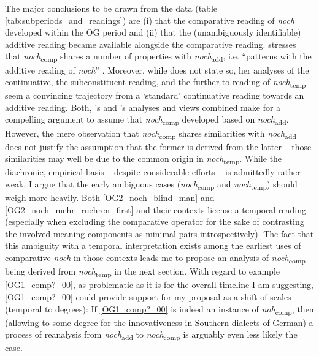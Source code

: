 \documentclass[output=paper,
modfonts
]{langscibook}
\begin{document}
The major conclusions to be drawn from the data (table \ref{tab:subperiods_and_readings}) are (i) that the comparative reading of \textit{noch} developed within the OG period and (ii) that the (unambiguously identifiable) additive reading became available alongside the comparative reading. \citeauthor{umbach2009a_comp} \citeyearpar{umbach2009a_comp} stresses that \textit{noch}\textsubscript{comp} shares a number of properties with \textit{noch}\textsubscript{add}, i.e. ``patterns with the additive reading of \textit{noch}'' \citep[p.9]{umbach2009a_comp}. Moreover, while \citeauthor{beck2016a_sub} does not state so, her \citeyearpar{beck2016a_sub} analyses of the continuative, the subconstituent reading, and the further-to reading of \textit{noch}\textsubscript{temp} seem a convincing trajectory from a `standard' continuative reading towards an additive reading. Both, \citeauthor{umbach2009a_comp}'s \citeyearpar{umbach2009a_comp} and \citeauthor{beck2016a_sub}'s \citeyearpar{beck2016a_sub} analyses and views combined make for a compelling argument to assume that \textit{noch}\textsubscript{comp} developed based on \textit{noch}\textsubscript{add}. However, the mere observation that \textit{noch}\textsubscript{comp} shares similarities with \textit{noch}\textsubscript{add} does not justify the assumption that the former is derived from the latter -- those similarities may well be due to the common origin in \textit{noch}\textsubscript{temp}. While the diachronic, empirical basis -- despite considerable efforts -- is admittedly rather weak, I argue that the early ambiguous cases (\textit{noch}\textsubscript{comp} and \textit{noch}\textsubscript{temp}) should weigh more heavily. Both \ref{OG2_noch_blind_man} and \ref{OG2_noch_mehr_ruehren_first} and their contexts license a temporal reading (especially when excluding the comparative operator for the sake of contrasting the involved meaning components as minimal pairs introspectively). The fact that this ambiguity with a temporal interpretation exists among the earliest uses of comparative \textit{noch} in those contexts leads me to propose an analysis of \textit{noch}\textsubscript{comp} being derived from \textit{noch}\textsubscript{temp} in the next section. With regard to example \ref{OG1_comp?_00}, as problematic as it is for the overall timeline I am suggesting, \ref{OG1_comp?_00} could provide support for my proposal as a shift of scales (temporal to degrees): If \ref{OG1_comp?_00} is indeed an instance of \textit{noh}\textsubscript{comp}, then (allowing to some degree for the innovativeness in Southern dialects of German) a process of reanalysis from \textit{noch}\textsubscript{add} to \textit{noch}\textsubscript{comp} is arguably even less likely the case.
\end{document}
